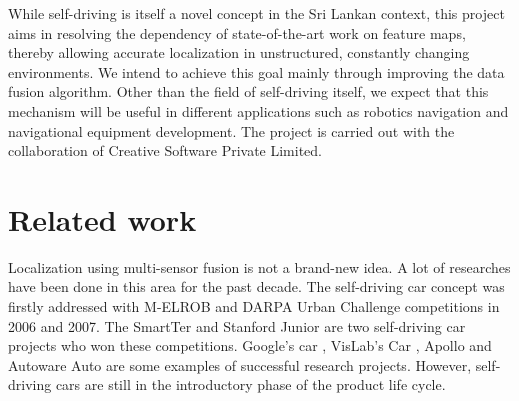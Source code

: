 While self-driving is itself a novel concept in the Sri Lankan context, this project aims in resolving the dependency of state-of-the-art work on feature maps, thereby allowing accurate localization in unstructured, constantly changing environments. We intend to achieve this goal mainly through improving the data fusion algorithm. Other than the field of self-driving itself, we expect that this mechanism will be useful in different applications such as robotics navigation and navigational equipment development. The project is carried out with the collaboration of Creative Software Private Limited.





\section{Related work}
Localization using multi-sensor fusion is not a brand-new idea. A lot of researches have been done in this area for the past decade. The self-driving car concept was firstly addressed with \gls{M-ELROB} and \gls{DARPA} Urban Challenge competitions in 2006 and 2007\cite{pa:GIZA}. The SmartTer \cite{pa:Smartter} and Stanford Junior \cite{pa:StanfordJunior} are two self-driving car projects who won these competitions. Google’s car \cite{pa:GoogleCar}, VisLab’s Car \cite{pa:VisilabCar}, Apollo \cite{pa:Apollo} and Autoware Auto \cite{pa:AutowareAuto} are some examples of successful research projects. However, self-driving cars are still in the introductory phase of the product life cycle.


